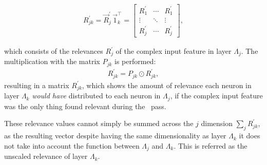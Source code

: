 \begin{enumerate}
\begin{eqnarray*}
R_{jk}^\prime = \vec{R}_j^\prime \, \vec{1}_k^\intercal = \left[\begin{array}{ccc}
R_1^\prime & \cdots &R_1^\prime \\
\vdots & \ddots & \vdots \\
R_j^\prime & \cdots & R_j^\prime
\end{array}\right],
\end{eqnarray*}

which consists of the relevances $R_{j}^\prime$ of the complex input feature in layer $\Lambda_j$. The multiplication with the matrix $P_{jk}$ is performed:
\begin{eqnarray*}
R_{jk}^\prime = P_{jk} \odot R_{jk}^\prime, 
\end{eqnarray*}
resulting in a matrix $R_{jk}^\prime$, which shows the amount of relevance each neuron in layer $\Lambda_k$ \emph{would have} distributed to each neuron in $\Lambda_j$, if the complex input feature was the only thing found relevant during the \LRP\ pass.

These relevance values cannot simply be summed across the $j$ dimension $\sum_{j}R_{jk}^\prime$, as the resulting vector despite having the same dimensionality as layer $\Lambda_k$ it does not take into account the function between $\Lambda_j$ and $\Lambda_k$. This is referred as the unscaled relevance of layer $\Lambda_k$.


\end{enumerate}

